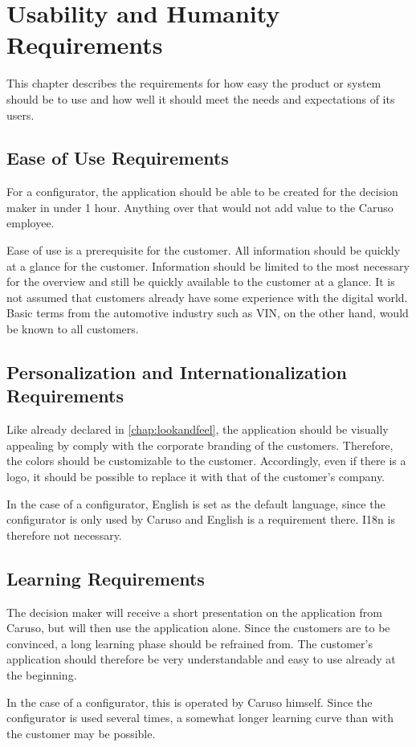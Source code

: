 \chapter{Usability and Humanity Requirements}
This chapter describes the requirements for how easy the product or system should be to use and how well it should meet the needs and expectations of its users.
\section{Ease of Use Requirements}
For a configurator, the application should be able to be created for the decision maker in under 1 hour. 
Anything over that would not add value to the Caruso employee.


Ease of use is a prerequisite for the customer. All information should be quickly at a glance for the customer. 
Information should be limited to the most necessary for the overview and still be quickly available to the customer at a glance.
It is not assumed that customers already have some experience with the digital world. 
Basic terms from the automotive industry such as VIN, on the other hand, would be known to all customers.


\section{Personalization and Internationalization Requirements}
Like already declared in \autoref{chap:lookandfeel}, the application should be visually appealing by comply with the corporate branding of the customers.
Therefore, the colors should be customizable to the customer. Accordingly, even if there is a logo, it should be possible to replace it with that of the customer's company.

In the case of a configurator, English is set as the default language, since the configurator is only used by Caruso and English is a requirement there. I18n is therefore not necessary.

\section{Learning Requirements}
The decision maker will receive a short presentation on the application from Caruso, but will then use the application alone. 
Since the customers are to be convinced, a long learning phase should be refrained from.
The customer's application should therefore be very understandable and easy to use already at the beginning. 


In the case of a configurator, this is operated by Caruso himself. 
Since the configurator is used several times, a somewhat longer learning curve than with the customer may be possible. 